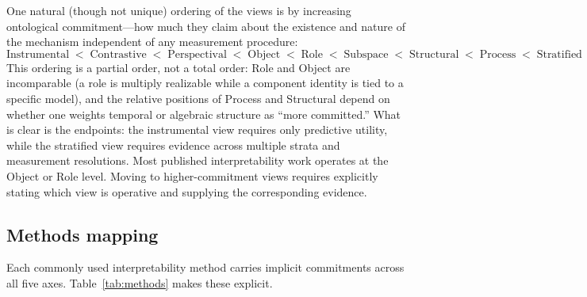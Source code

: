 \documentclass{article}
\begin{document}
One natural (though not unique) ordering of the views is by
increasing ontological commitment---how much they claim about the
existence and nature of the mechanism independent of any measurement
procedure:
\[
\text{Instrumental} \;<\; \text{Contrastive} \;<\; \text{Perspectival}
\;<\; \text{Object} \;<\; \text{Role} \;<\; \text{Subspace} \;<\;
\text{Structural} \;<\; \text{Process} \;<\; \text{Stratified}
\]
This ordering is a partial order, not a total order: Role and Object are incomparable (a role is multiply realizable while a component identity is tied to a specific model), and the relative positions of Process and Structural depend on whether one weights temporal or algebraic structure as ``more committed.''  What is clear is the endpoints: the instrumental view requires only predictive
utility, while the stratified view requires evidence across multiple
strata and measurement resolutions.  Most published interpretability
work operates at the Object or Role level.  Moving to
higher-commitment views requires explicitly stating which view is
operative and supplying the corresponding evidence.


\subsection{Methods mapping}\label{sec:methods}

Each commonly used interpretability method carries implicit commitments
across all five axes.  Table~\ref{tab:methods} makes these explicit.
\end{document}
